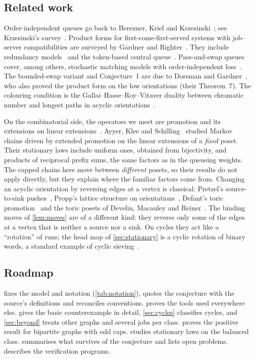 \documentclass[11pt,a4paper]{article}
\theoremstyle{plain}
\theoremstyle{plain}
\begin{document}
\subsection{Related work}

Order-independent queues go back to Berezner, Kriel and Krzesinski~\cite{BKK1995}; see Krzesinski's survey~\cite{Krz2011}. Product forms for first-come-first-served systems with job--server compatibilities are surveyed by Gardner and Righter~\cite{GR2020}. They include redundancy models~\cite{GZDHHS2016,GHSVZ2017,ABV2018} and the token-based central queue~\cite{ABDV2022}. Pass-and-swap queues~\cite{CD2021} cover, among others, stochastic matching models with order-independent loss~\cite{Com2022}. The bounded-swap variant and Conjecture~1 are due to Dorsman and Gardner~\cite{DG2024}, who also proved the product form on the low orientations (their Theorem~7). The colouring condition is the Gallai--Hasse--Roy--Vitaver duality between chromatic number and longest paths in acyclic orientations~\cite{Roy1967}.

On the combinatorial side, the operators we meet are promotion and its extensions on linear extensions~\cite{Sch1972,Sta2009,AKS2014}. Ayyer, Klee and Schilling~\cite{AKS2014} studied Markov chains driven by extended promotion on the linear extensions of a \emph{fixed} poset. Their stationary laws include uniform ones, obtained from bijectivity, and products of reciprocal prefix sums, the same factors as in the queueing weights. The capped chains here move between \emph{different} posets, so their results do not apply directly, but they explain where the familiar factors come from. Changing an acyclic orientation by reversing edges at a vertex is classical: Pretzel's source-to-sink pushes~\cite{Pre1986}, Propp's lattice structure on orientations~\cite{Pro2025}, Defant's toric promotion~\cite{Def2023} and the toric posets of Develin, Macauley and Reiner~\cite{DMR2016}. The binding moves of \cref{lem:moves} are of a different kind: they reverse only some of the edges at a vertex that is neither a source nor a sink. On cycles they act like a ``rotation'' of runs; the head map of \cref{sec:stationary} is a cyclic rotation of binary words, a standard example of cyclic sieving~\cite{RSW2004}.

\subsection{Roadmap}

 fixes the model and notation (\cref{tab:notation}), quotes the conjecture with the source's definitions and reconciles conventions.  proves the tools used everywhere else.  gives the basic counterexample in detail, \cref{sec:cycles} classifies cycles, and \cref{sec:beyond} treats other graphs and several jobs per class.  proves the positive result for bipartite graphs with odd caps.  studies stationary laws on the balanced class.  summarises what survives of the conjecture and lists open problems.  describes the verification programs.
\end{document}
